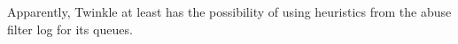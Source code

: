 Apparently, Twinkle at least has the possibility of using heuristics from the abuse filter log for its queues.

